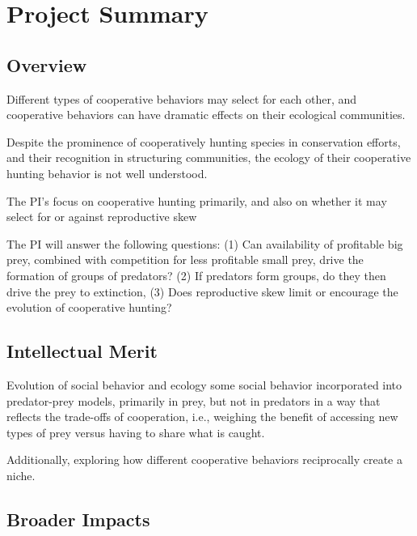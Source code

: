 
\section{Project Summary}
\subsection{Overview}
Different types of cooperative behaviors may select for each other, and cooperative behaviors can have dramatic effects on their ecological communities.


Despite the prominence of cooperatively hunting species in conservation efforts, and their recognition in structuring communities, the ecology of their cooperative hunting behavior is not well understood.

The PI's focus on cooperative hunting primarily, and also on whether it may select for or against reproductive skew


The PI will answer the following questions: (1) Can availability of profitable big prey, combined with competition for less profitable small prey, drive the formation of groups of predators? (2) If predators form groups, do they then drive the prey to extinction, (3) Does reproductive skew limit or encourage the evolution of cooperative hunting? 

\subsection{Intellectual Merit}
Evolution of social behavior and ecology
some social behavior incorporated into predator-prey models, primarily in prey, but not in predators in a way that reflects the trade-offs of cooperation, i.e., weighing the benefit of accessing new types of prey versus having to share what is caught. 

Additionally, exploring how different cooperative behaviors reciprocally create a niche.

\subsection{Broader Impacts}
